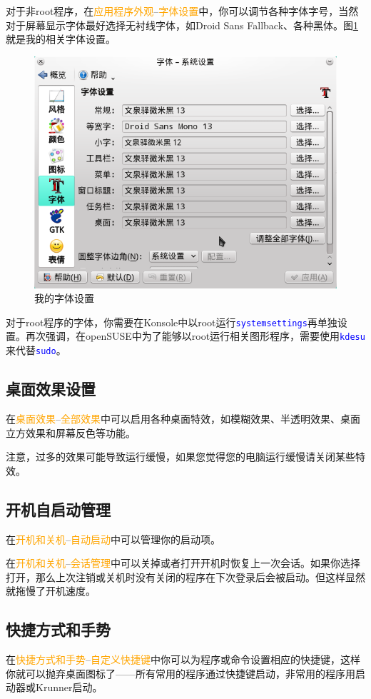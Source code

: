 \documentclass[12pt,openany]{book}
\newcommand{\command}[1]{\texttt{\textcolor{blue}{#1}}}
\newcommand{\menu}[1]{\textcolor{orange}{#1}}
\begin{document}
对于非root程序，在\menu{应用程序外观}--\menu{字体设置}中，你可以调节各种字体字号，当然对于屏幕显示字体最好选择无衬线字体，如Droid Sans Fallback、各种黑体。图\ref{myfont}就是我的相关字体设置。
\begin{figure}[htbp]
 \centering
 \includegraphics[width=\textwidth]{./pic/fontsettings.png}
 \caption{我的字体设置}\label{myfont}
\end{figure}

对于root程序的字体，你需要在Konsole中以root运行\command{systemsettings}再单独设置。再次强调，在openSUSE中为了能够以root运行相关图形程序，需要使用\command{kdesu}来代替\command{sudo}。

\subsection{桌面效果设置}
在\menu{桌面效果}--\menu{全部效果}中可以启用各种桌面特效，如模糊效果、半透明效果、桌面立方效果和屏幕反色等功能。

注意，过多的效果可能导致运行缓慢，如果您觉得您的电脑运行缓慢请关闭某些特效。
\subsection{开机自启动管理}
在\menu{开机和关机}--\menu{自动启动}中可以管理你的启动项。

在\menu{开机和关机}--\menu{会话管理}中可以关掉或者打开开机时恢复上一次会话。如果你选择打开，那么上次注销或关机时没有关闭的程序在下次登录后会被启动。但这样显然就拖慢了开机速度。
\subsection{快捷方式和手势}
在\menu{快捷方式和手势}--\menu{自定义快捷键}中你可以为程序或命令设置相应的快捷键，这样你就可以抛弃桌面图标了——所有常用的程序通过快捷键启动，非常用的程序用启动器或Krunner启动。
\end{document}
